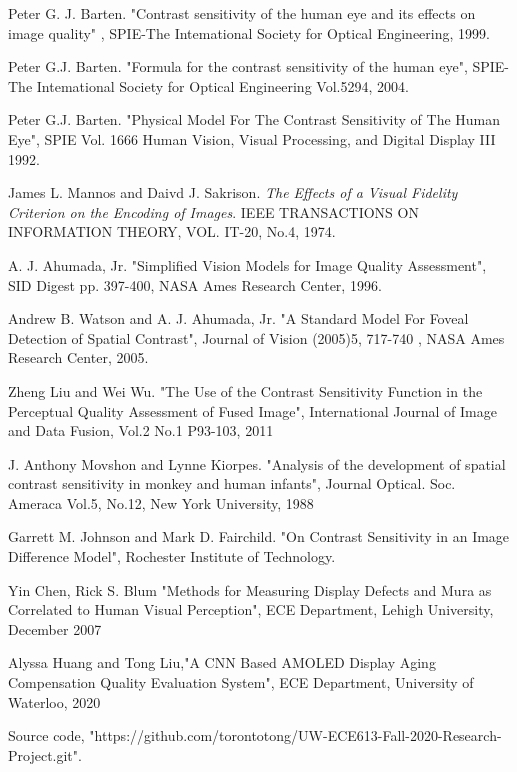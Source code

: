 \documentclass{article}
\begin{document}
\clearpage
\begin{thebibliography}{8}
Peter G. J. Barten. 
"Contrast sensitivity of the human eye and its effects on image quality" ,
SPIE-The Intemational Society for Optical Engineering, 1999.

Peter G.J. Barten.
"Formula for the contrast sensitivity of the human eye",
SPIE-The Intemational Society for Optical Engineering Vol.5294, 2004.

Peter G.J. Barten.
"Physical Model For The Contrast Sensitivity of The Human Eye",
SPIE Vol. 1666 Human Vision, Visual Processing, and Digital Display III 1992.

James L. Mannos and Daivd J. Sakrison.
\textit{The Effects of a Visual Fidelity Criterion on the Encoding of Images}.
IEEE TRANSACTIONS ON INFORMATION THEORY, VOL. IT-20, No.4, 1974.

A. J. Ahumada, Jr.
"Simplified Vision Models for Image Quality Assessment",
SID Digest pp. 397-400, NASA Ames Research Center, 1996.

Andrew B. Watson and A. J. Ahumada, Jr.
"A Standard Model For Foveal Detection of Spatial Contrast",
Journal of Vision (2005)5, 717-740 , NASA Ames Research Center, 2005.

Zheng Liu and Wei Wu.
"The Use of the Contrast Sensitivity Function in the Perceptual Quality Assessment of Fused Image",
International Journal of Image and Data Fusion, Vol.2 No.1 P93-103, 2011

J. Anthony Movshon and Lynne Kiorpes.
"Analysis of the development of spatial contrast sensitivity in monkey and human infants",
Journal Optical. Soc. Ameraca Vol.5, No.12, New York University, 1988

Garrett M. Johnson and Mark D. Fairchild.
"On Contrast Sensitivity in an Image Difference Model", 
Rochester Institute of Technology.

Yin Chen, Rick S. Blum
"Methods for Measuring Display Defects and Mura as Correlated to Human Visual Perception",
ECE Department, Lehigh University, December 2007

Alyssa Huang and Tong Liu,"A CNN Based AMOLED Display Aging Compensation Quality Evaluation System", ECE Department, University of Waterloo, 2020

Source code, "https://github.com/torontotong/UW-ECE613-Fall-2020-Research-Project.git".
\end{thebibliography}
\end{document}
